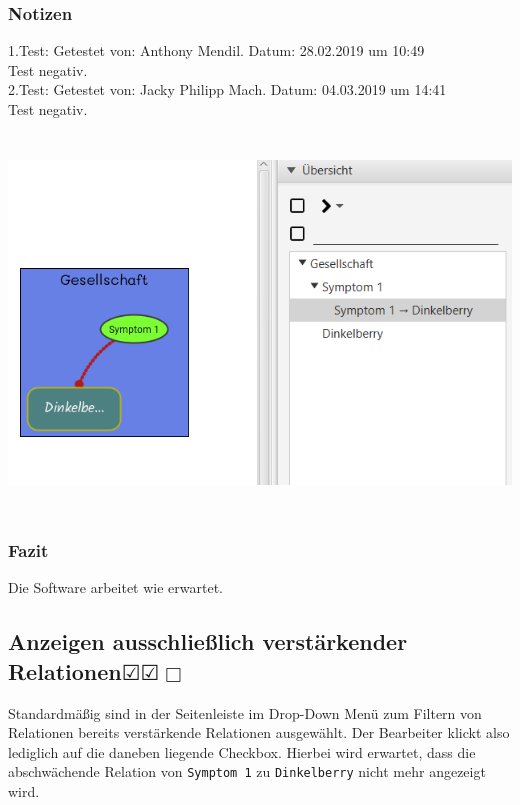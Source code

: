 \documentclass[enabledeprecatedfontcommands]{scrartcl}
\newcommand{\subsectiont}[2]{\subsection[#1]{#1{\normalsize\normalfont #2}}}
\newcommand{\leer}{$\Box$}
\newcommand{\ok}{$\CheckedBox$}
\begin{document}
\subsubsection{Notizen}
1.Test: Getestet von: Anthony Mendil. Datum: 28.02.2019 um 10:49 \\
Test negativ. \\
2.Test: Getestet von: Jacky Philipp Mach. Datum: 04.03.2019 um 14:41 \\
Test negativ.
\begin{center}
\includegraphics[height=10cm]{relationAnklicken.PNG}
\end{center}
\subsubsection{Fazit}
Die Software arbeitet wie erwartet.

\subsectiont{Anzeigen ausschließlich verstärkender Relationen}{\dotfill\ok\ok\leer}
Standardmäßig sind in der Seitenleiste im Drop-Down Menü zum Filtern von Relationen bereits verstärkende Relationen ausgewählt. Der Bearbeiter klickt also lediglich auf die daneben liegende Checkbox. Hierbei wird erwartet, dass die abschwächende Relation von \texttt{Symptom 1} zu \texttt{Dinkelberry} nicht mehr angezeigt wird.
\end{document}

